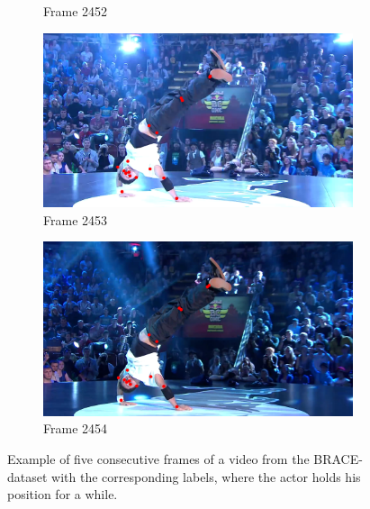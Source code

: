 \documentclass[./main.tex]{subfiles}
\begin{document}
\begin{figure}[htbp]
\begin{subfigure}{0.5\textwidth}
        \caption{Frame 2452}
    \end{subfigure}
    \begin{subfigure}{0.5\textwidth}
        \centering
        \includegraphics[width=\textwidth]{entities/BRACE_2453.png}
        \caption{Frame 2453}
    \end{subfigure}
    \begin{subfigure}{0.5\textwidth}
        \centering
        \includegraphics[width=\textwidth]{entities/BRACE_2454.png}
        \caption{Frame 2454}
    \end{subfigure}

    \caption{Example of five consecutive frames of a video from the BRACE-dataset with the corresponding labels,
    where the actor holds his position for a while.}
    \label{fig:BRACE_dataset_static}
\end{figure}
\end{document}
